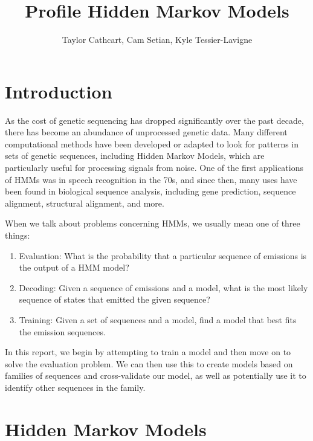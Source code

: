 \documentclass{article}
\title{Profile Hidden Markov Models}
\author{Taylor Cathcart, Cam Setian, Kyle Tessier-Lavigne}
\begin{document}
\maketitle

\section{Introduction}

As the cost of genetic sequencing has dropped significantly over the past decade, there has become an abundance of unprocessed genetic data. Many different computational methods have been developed or adapted to look for patterns in sets of genetic sequences, including Hidden Markov Models, which are particularly useful for processing signals from noise. One of the first applications of HMMs was in speech recognition in the 70s, and since then, many uses have been found in biological sequence analysis, including gene prediction, sequence alignment, structural alignment, and more.\footnotemark[1] 

When we talk about problems concerning HMMs, we usually mean one of three things:
\begin{enumerate}
\item Evaluation: What is the probability that a particular sequence of emissions is the output of a HMM model?
\item Decoding: Given a sequence of emissions and a model, what is the most likely sequence of states that emitted the given sequence?
\item Training: Given a set of sequences and a model, find a model that best fits the emission sequences.
\end{enumerate}
In this report, we begin by attempting to train a model and then move on to solve the evaluation problem. We can then use this to create models based on families of sequences and cross-validate our model, as well as potentially use it to identify other sequences in the family.


\section{Hidden Markov Models}
\end{document}
